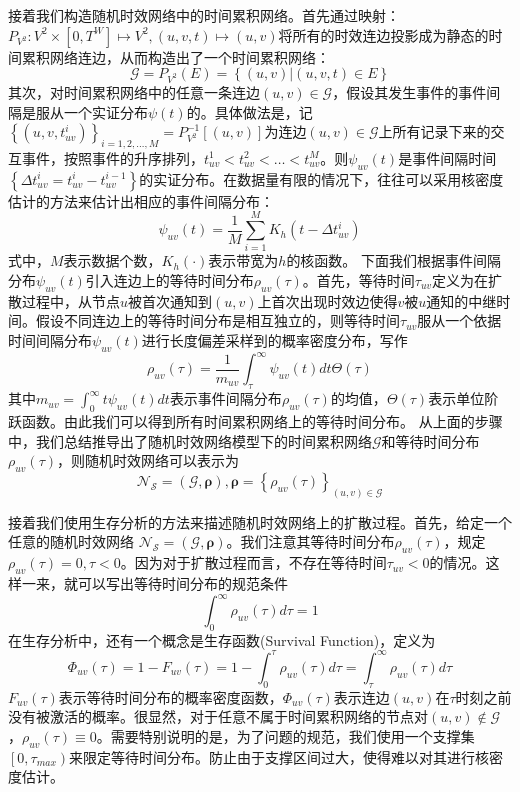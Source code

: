 \documentclass[journal]{IEEEtran}
\begin{document}
		接着我们构造随机时效网络中的时间累积网络。首先通过映射：$P_{V^2}:V^2 \times \left[0,T^W\right] \mapsto V^2,(u,v,t) \mapsto (u,v)$将所有的时效连边投影成为静态的时间累积网络连边，从而构造出了一个时间累积网络：
		$$\mathcal{G}=P_{V^2}(E)=\left\{ (u,v)|(u,v,t)\in E \right\}$$
		其次，对时间累积网络中的任意一条连边$(u,v)\in \mathcal{G}$，假设其发生事件的事件间隔是服从一个实证分布$\psi(t)$的。具体做法是，记$\left\{ (u,v,t_{uv}^i) \right\}_{i=1,2,\ldots,M}=P_{V^2}^{-1}\left[(u,v)\right]$为连边$(u,v)\in \mathcal{G}$上所有记录下来的交互事件，按照事件的升序排列，$t_{uv}^1<t_{uv}^2<\ldots<t_{uv}^M$。则$\psi_{uv}(t)$是事件间隔时间$\left\{ \Delta t_{uv}^i=t_{uv}^i-t_{uv}^{i-1}\right\}$的实证分布。在数据量有限的情况下，往往可以采用核密度估计的方法来估计出相应的事件间隔分布：
		$$\psi_{uv}(t)=\frac{1}{M}\sum_{i=1}^MK_h(t-\Delta t_{uv}^i)$$
		式中，$M$表示数据个数，$K_h(\cdot{})$表示带宽为$h$的核函数。
		下面我们根据事件间隔分布$\psi_{uv}(t)$引入连边上的等待时间分布$\rho_{uv}(\tau)$。首先，等待时间$\tau_{uv}$定义为在扩散过程中，从节点$u$被首次通知到$(u,v)$上首次出现时效边使得$v$被$u$通知的中继时间。假设不同连边上的等待时间分布是相互独立的，则等待时间$\tau_{uv}$服从一个依据时间间隔分布$\psi_{uv}(t)$进行长度偏差采样到的概率密度分布，写作
		$$\rho_{uv}(\tau)=\frac{1}{m_{uv}} \int_\tau^{\infty}\psi_{uv}(t)dt\Theta(\tau)$$
		其中$m_{uv}=\int_0^\infty t\psi_{uv}(t)dt$表示事件间隔分布$\rho_{uv}(\tau)$的均值，$\Theta(\tau)$表示单位阶跃函数。由此我们可以得到所有时间累积网络上的等待时间分布。
		从上面的步骤中，我们总结推导出了随机时效网络模型下的时间累积网络$\mathcal{G}$和等待时间分布$\rho_{uv}(\tau)$，则随机时效网络可以表示为
		$$\mathcal{N_S=(G,\bm{\rho})},\bm\rho=\left\{ \rho_{uv}(\tau) \right\}_{(u,v)\in \mathcal{G}} $$
		
		接着我们使用生存分析的方法来描述随机时效网络上的扩散过程。首先，给定一个任意的随机时效网络	$\mathcal{N_S=(G,\bm{\rho})}$。我们注意其等待时间分布$\rho_{uv}(\tau)$，规定$\rho_{uv}(\tau)=0,\tau<0$。因为对于扩散过程而言，不存在等待时间$\tau_{uv}<0$的情况。这样一来，就可以写出等待时间分布的规范条件
		$$\int_0^\infty \rho_{uv}(\tau)d\tau=1$$
		在生存分析中，还有一个概念是生存函数(Survival Function)，定义为
		$$	\Phi_{uv}(\tau)=1-F_{uv}(\tau)=1-\int_0^\tau \rho_{uv}(\tau)d\tau=\int_\tau^\infty \rho_{uv}(\tau)d\tau$$
		$F_{uv}(\tau)$表示等待时间分布的概率密度函数，$\Phi_{uv}(\tau)$表示连边$(u,v)$在$\tau$时刻之前没有被激活的概率。很显然，对于任意不属于时间累积网络的节点对$(u,v)\notin \mathcal{G}$，$\rho_{uv}(\tau)\equiv 0$。需要特别说明的是，为了问题的规范，我们使用一个支撑集$\left[0,\tau_{max}\right)$来限定等待时间分布。防止由于支撑区间过大，使得难以对其进行核密度估计。
	
\end{document}
